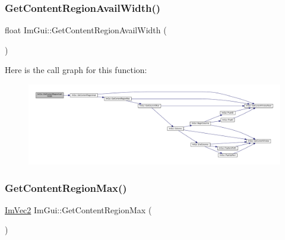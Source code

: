 \subsubsection{\texorpdfstring{Get\+Content\+Region\+Avail\+Width()}{GetContentRegionAvailWidth()}}
{\footnotesize\ttfamily float Im\+Gui\+::\+Get\+Content\+Region\+Avail\+Width (\begin{DoxyParamCaption}{ }\end{DoxyParamCaption})}

Here is the call graph for this function\+:
\nopagebreak
\begin{figure}[H]
\begin{center}
\leavevmode
\includegraphics[width=350pt]{namespace_im_gui_a52e3311f46626a5d0369139d20da993a_cgraph}
\end{center}
\end{figure}
\mbox{\label{namespace_im_gui_a0a4dbfabbfa45d74319ef541962ce2eb}} 
\subsubsection{\texorpdfstring{Get\+Content\+Region\+Max()}{GetContentRegionMax()}}
{\footnotesize\ttfamily \mbox{\hyperlink{struct_im_vec2}{Im\+Vec2}} Im\+Gui\+::\+Get\+Content\+Region\+Max (\begin{DoxyParamCaption}{ }\end{DoxyParamCaption})}

